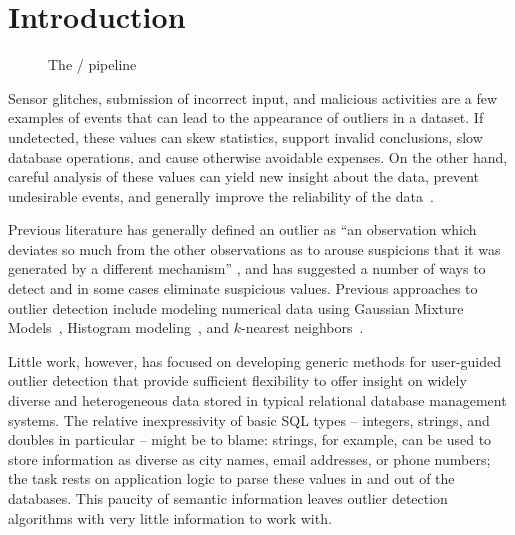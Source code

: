 \section{Introduction}
\label{sec:intro}

\begin{figure*}
  \centering %
  \caption{The \dBoost/ pipeline}
  \label{fig:pipeline}
\end{figure*}

Sensor glitches, submission of incorrect input, and malicious activities are a few examples of events that can lead to the appearance of outliers in a dataset. If undetected, these values can skew statistics, support invalid conclusions, slow database operations, and cause otherwise avoidable expenses. On the other hand, careful analysis of these values can yield new insight about the data, prevent undesirable events, and generally improve the reliability of the data~\cite{Achour2014}.

Previous literature has generally defined an outlier as ``an observation which deviates so much from the other observations as to arouse suspicions that it was generated by a different mechanism'' \cite{Hawkins1980}, and has suggested a number of ways to detect and in some cases eliminate suspicious values. Previous approaches to outlier detection include modeling numerical data using Gaussian Mixture Models~\cite{Lu2005,Roberts1994,Roberts1999}, Histogram modeling~\cite{Gebski2007,Sheng2007}, and $k$-nearest neighbors~\cite{Ramaswamy2000}.

Little work, however, has focused on developing generic methods for user-guided outlier detection that provide sufficient flexibility to offer insight on widely diverse and heterogeneous data stored in typical relational database management systems. The relative inexpressivity of basic SQL types -- integers, strings, and doubles in particular -- might be to blame: strings, for example, can be used to store information as diverse as city names, email addresses, or phone numbers; the task rests on application logic to parse these values in and out of the databases. This paucity of semantic information leaves outlier detection algorithms with very little information to work with.

